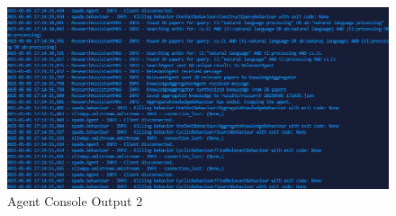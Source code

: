 \documentclass{article}
\begin{document}
\begin{figure}[H]
    \centering
    \includegraphics[width=\textwidth]{images/screenshot_2.png}
    \caption{Agent Console Output 2}
    \label{fig:screenshot2}
\end{figure}
\end{document}
